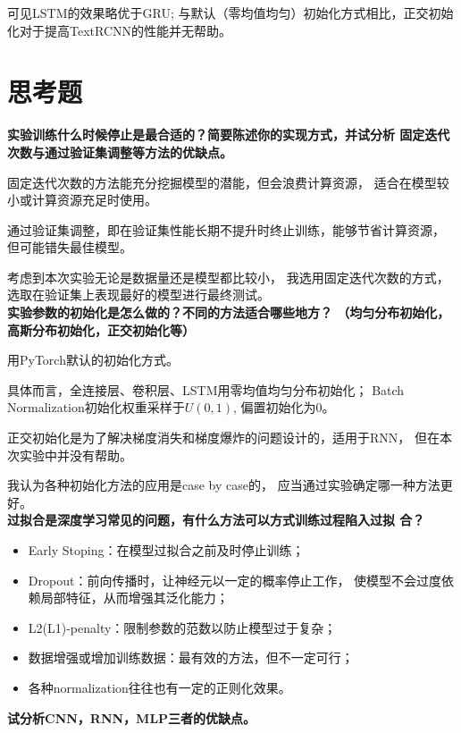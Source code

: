 \documentclass[12pt, UTF8, a4paper]{ctexart}
\begin{document}
\FloatBarrier

可见LSTM的效果略优于GRU;
与默认（零均值均匀）初始化方式相比，正交初始化对于提高TextRCNN的性能并无帮助。

\section{思考题}

\textbf{实验训练什么时候停止是最合适的？简要陈述你的实现方式，并试分析
固定迭代次数与通过验证集调整等方法的优缺点。}

固定迭代次数的方法能充分挖掘模型的潜能，但会浪费计算资源，
适合在模型较小或计算资源充足时使用。

通过验证集调整，即在验证集性能长期不提升时终止训练，能够节省计算资源，
但可能错失最佳模型。

考虑到本次实验无论是数据量还是模型都比较小，
我选用固定迭代次数的方式，
选取在验证集上表现最好的模型进行最终测试。\\

\textbf{实验参数的初始化是怎么做的？不同的方法适合哪些地方？
（均匀分布初始化，高斯分布初始化，正交初始化等）}

用PyTorch默认的初始化方式。

具体而言，全连接层、卷积层、LSTM用零均值均匀分布初始化；
Batch Normalization初始化权重采样于$U(0,1)$, 偏置初始化为0。

正交初始化是为了解决梯度消失和梯度爆炸的问题设计的，适用于RNN，
但在本次实验中并没有帮助。

我认为各种初始化方法的应用是case by case的，
应当通过实验确定哪一种方法更好。\\

\textbf{过拟合是深度学习常见的问题，有什么方法可以方式训练过程陷入过拟
合？}

\begin{itemize}
    \item Early Stoping：在模型过拟合之前及时停止训练；
    \item Dropout：前向传播时，让神经元以一定的概率停止工作，
    使模型不会过度依赖局部特征，从而增强其泛化能力；
    \item L2(L1)-penalty：限制参数的范数以防止模型过于复杂；
    \item 数据增强或增加训练数据：最有效的方法，但不一定可行；
    \item 各种normalization往往也有一定的正则化效果。
\end{itemize}

\textbf{试分析CNN，RNN，MLP三者的优缺点。}
\end{document}
